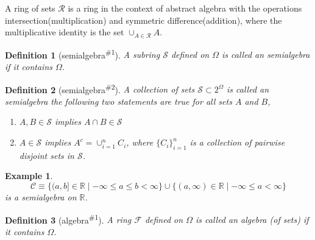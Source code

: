 \documentclass{report}
\newtheorem{definition}{Definition}[section]
\newtheorem{example}{Example}[section]
\theoremstyle{nonumberplain}
\begin{document}
A ring of sets $\mathcal{R}$ is a ring in the context of abstract algebra with the operations intersection(multiplication) and symmetric difference(addition), where the multiplicative identity is the set $\cup_{A\in \mathcal{R}} A$. 

\begin{definition}[semialgebra\textsuperscript{\#1}]
	A subring $\mathcal{S}$ defined on $\Omega$ is called an \emph{semialgebra} if it contains $\Omega$. 
\end{definition}

\begin{definition}[semialgebra\textsuperscript{\#2}]
	A collection of sets $\mathcal{S}\subset 2^{\Omega}$ is called an  \emph{semialgebra} the following two statements are true for all sets $A$ and $B$,
	\begin{enumerate}[(1)]
		\item $A,B\in \mathcal{S}$ implies $A\cap B\in\mathcal{S}$ 
		\item $A\in \mathcal{S}$ implies $A^c=\cup_{i=1}^n C_i$, where $\{C_{i}\}_{i=1}^{n}$ is a collection of pairwise disjoint sets in $\mathcal{S}$.
	\end{enumerate}	
\end{definition}

\begin{example}
	\[
	\mathcal{C} \equiv\{(a, b]\in\mathbb{R}\mid-\infty \leq a \leq b<\infty\} \cup\{(a, \infty)\in\mathbb{R}\mid-\infty \leq a<\infty\}
	\]
	is a semialgebra on $\mathbb{R}$.
\end{example}

\begin{definition}[algebra\textsuperscript{\#1}]
	A ring $\mathcal{F}$ defined on $\Omega$ is called an \emph{algebra (of sets)} if it contains $\Omega$. 
\end{definition}
\end{document}
